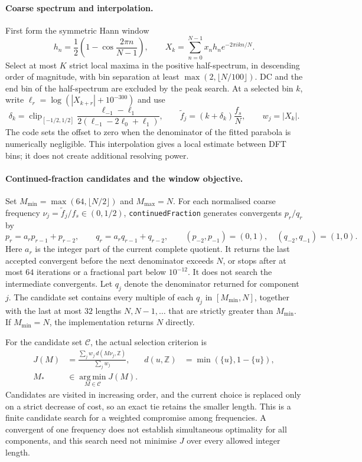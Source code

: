\paragraph{Coarse spectrum and interpolation.}
First form the symmetric Hann window
\[
h_n=\frac12\left(1-\cos\frac{2\pi n}{N-1}\right),\qquad
X_k=\sum_{n=0}^{N-1}x_nh_n e^{-2\pi i kn/N}.
\]
Select at most \(K\) strict local maxima in the positive half-spectrum, in descending order of magnitude, with bin separation at least \(\max(2,\lfloor N/100\rfloor)\). DC and the end bin of the half-spectrum are excluded by the peak search. At a selected bin \(k\), write \(\ell_r=\log(|X_{k+r}|+10^{-300})\) and use
\[
\delta_k=\operatorname{clip}_{[-1/2,1/2]}
 \frac{\ell_{-1}-\ell_{1}}{2(\ell_{-1}-2\ell_0+\ell_1)},
\qquad
\widetilde f_j=(k+\delta_k)\frac{f_s}{N},\qquad w_j=|X_k|.
\]
The code sets the offset to zero when the denominator of the fitted parabola is numerically negligible. This interpolation gives a local estimate between DFT bins; it does not create additional resolving power.

\paragraph{Continued-fraction candidates and the window objective.}
Set \(M_{\min}=\max(64,\lfloor N/2\rfloor)\) and \(M_{\max}=N\). For each normalised coarse frequency \(\nu_j=\widetilde f_j/f_s\in(0,1/2)\), \texttt{continuedFraction} generates convergents \(p_r/q_r\) by
\[
p_r=a_rp_{r-1}+p_{r-2},\qquad
q_r=a_rq_{r-1}+q_{r-2},\qquad
(p_{-2},p_{-1})=(0,1),\quad(q_{-2},q_{-1})=(1,0).
\]
Here \(a_r\) is the integer part of the current complete quotient. It returns the last accepted convergent before the next denominator exceeds \(N\), or stops after at most \(64\) iterations or a fractional part below \(10^{-12}\). It does not search the intermediate convergents. Let \(q_j\) denote the denominator returned for component \(j\). The candidate set contains every multiple of each \(q_j\) in \([M_{\min},N]\), together with the last at most \(32\) lengths \(N,N-1,\ldots\) that are strictly greater than \(M_{\min}\). If \(M_{\min}=N\), the implementation returns \(N\) directly.

For the candidate set \(\mathcal C\), the actual selection criterion is
\begin{equation}\label{eq:calendar_leap_window_cost}
\begin{aligned}
J(M)&=\frac{\sum_j w_j\,d(M\nu_j,\mathbb Z)}{\sum_j w_j},
& d(u,\mathbb Z)&=\min(\{u\},1-\{u\}),\\
M_*&\in\underset{M\in\mathcal C}{\operatorname{arg\,min}}J(M).
\end{aligned}
\end{equation}
Candidates are visited in increasing order, and the current choice is replaced only on a strict decrease of cost, so an exact tie retains the smaller length. This is a finite candidate search for a weighted compromise among frequencies. A convergent of one frequency does not establish simultaneous optimality for all components, and this search need not minimise \(J\) over every allowed integer length.

